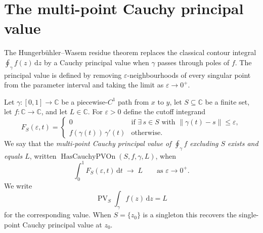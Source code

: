 \section{The multi-point Cauchy principal value}\label{sec:cpv}

The Hungerbühler--Wasem residue theorem replaces the classical contour
integral $\oint_\gamma f(z)\,\mathrm{d}z$ by a Cauchy principal value
when $\gamma$ passes through poles of $f$. The principal value is
defined by removing $\varepsilon$-neighbourhoods of every singular
point from the parameter interval and taking the limit as
$\varepsilon \to 0^+$.

\begin{definition}
  \label{def:has-cauchy-pv-on}
  \leanok
  Let $\gamma : [0,1] \to \mathbb{C}$ be a piecewise-$C^{1}$ path
  from $x$ to $y$, let $S \subseteq \mathbb{C}$ be a finite set, let
  $f : \mathbb{C} \to \mathbb{C}$, and let $L \in \mathbb{C}$. For
  $\varepsilon > 0$ define the cutoff integrand
  \[
    F_S(\varepsilon, t) =
    \begin{cases}
      0 & \text{if } \exists\, s \in S \text{ with } \|\gamma(t) - s\| \le \varepsilon, \\
      f(\gamma(t))\, \gamma'(t) & \text{otherwise.}
    \end{cases}
  \]
  We say that the \emph{multi-point Cauchy principal value of
  $\oint_\gamma f$ excluding $S$ exists and equals $L$}, written
  $\operatorname{HasCauchyPVOn}(S, f, \gamma, L)$, when
  \[
    \int_0^1 F_S(\varepsilon, t)\,\mathrm{d}t
    \;\longrightarrow\; L \qquad \text{as } \varepsilon \to 0^+.
  \]
  We write
  \[
    \operatorname{PV}_S \int_\gamma f(z)\,\mathrm{d}z = L
  \]
  for the corresponding value. When $S = \{z_0\}$ is a singleton this
  recovers the single-point Cauchy principal value at $z_0$.
\end{definition}
